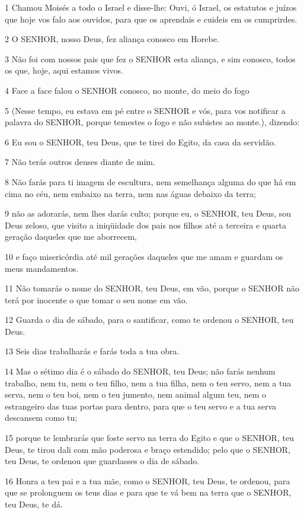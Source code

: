 \par 1 Chamou Moisés a todo o Israel e disse-lhe: Ouvi, ó Israel, os estatutos e juízos que hoje vos falo aos ouvidos, para que os aprendais e cuideis em os cumprirdes.
\par 2 O SENHOR, nosso Deus, fez aliança conosco em Horebe.
\par 3 Não foi com nossos pais que fez o SENHOR esta aliança, e sim conosco, todos os que, hoje, aqui estamos vivos.
\par 4 Face a face falou o SENHOR conosco, no monte, do meio do fogo
\par 5 (Nesse tempo, eu estava em pé entre o SENHOR e vós, para vos notificar a palavra do SENHOR, porque temestes o fogo e não subistes ao monte.), dizendo:
\par 6 Eu sou o SENHOR, teu Deus, que te tirei do Egito, da casa da servidão.
\par 7 Não terás outros deuses diante de mim.
\par 8 Não farás para ti imagem de escultura, nem semelhança alguma do que há em cima no céu, nem embaixo na terra, nem nas águas debaixo da terra;
\par 9 não as adorarás, nem lhes darás culto; porque eu, o SENHOR, teu Deus, sou Deus zeloso, que visito a iniqüidade dos pais nos filhos até a terceira e quarta geração daqueles que me aborrecem,
\par 10 e faço misericórdia até mil gerações daqueles que me amam e guardam os meus mandamentos.
\par 11 Não tomarás o nome do SENHOR, teu Deus, em vão, porque o SENHOR não terá por inocente o que tomar o seu nome em vão.
\par 12 Guarda o dia de sábado, para o santificar, como te ordenou o SENHOR, teu Deus.
\par 13 Seis dias trabalharás e farás toda a tua obra.
\par 14 Mas o sétimo dia é o sábado do SENHOR, teu Deus; não farás nenhum trabalho, nem tu, nem o teu filho, nem a tua filha, nem o teu servo, nem a tua serva, nem o teu boi, nem o teu jumento, nem animal algum teu, nem o estrangeiro das tuas portas para dentro, para que o teu servo e a tua serva descansem como tu;
\par 15 porque te lembrarás que foste servo na terra do Egito e que o SENHOR, teu Deus, te tirou dali com mão poderosa e braço estendido; pelo que o SENHOR, teu Deus, te ordenou que guardasses o dia de sábado.
\par 16 Honra a teu pai e a tua mãe, como o SENHOR, teu Deus, te ordenou, para que se prolonguem os teus dias e para que te vá bem na terra que o SENHOR, teu Deus, te dá.
